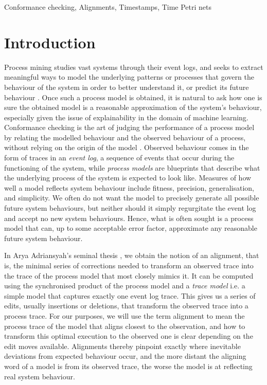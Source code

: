 \documentclass[conference]{IEEEtran}
\begin{document}
	
	\begin{IEEEkeywords}
		Conformance checking, Alignments, Timestamps, Time Petri nets
	\end{IEEEkeywords}
	
	\section{Introduction} 
    Process mining studies vast systems through their event logs, and seeks to extract meaningful ways to model the underlying patterns or processes that govern the behaviour of the system in order to better understand it, or predict its future behaviour \cite{A16}.
    Once such a process model is obtained, it is natural to ask how one is sure the obtained model is a reasonable approximation of the system’s behaviour, especially given the issue of explainability in the domain of machine learning.
    Conformance checking is the art of judging the performance of a process model by relating the modelled behaviour and the observed behaviour of a process, without relying on the origin of the model \cite{CDSW18}.
    Observed behaviour comes in the form of traces in an \textit{event log}, a sequence of events that occur during the functioning of the system, while \textit{process models} are blueprints that describe what the underlying process of the system is expected to look like.
    Measures of how well a model reflects system behaviour include fitness, precision, generalisation, and simplicity.
    We often do not want the model to precisely generate all possible future system behaviours, but neither should it simply regurgitate the event log and accept no new system behaviours. 
    Hence, what is often sought is a process model that can, up to some acceptable error factor, approximate any reasonable future system behaviour. 
    
    In Arya Adriansyah's seminal thesis \cite{Adriansyah2014AligningOA}, we obtain the notion of an alignment, that is, the minimal series of corrections needed to transform an observed trace into the trace of the process model that most closely mimics it.  
    It can be computed using the synchronised product of the process model and a \emph{trace model} i.e. a simple model that captures exactly one event log trace. 
    This gives us a series of edits, usually insertions or deletions, that transform the observed trace into a process trace.  
    For our purposes, we will use the term alignment to mean the process trace of the model that aligns closest to the observation, and how to transform this optimal execution to the observed one is clear depending on the edit moves available.
    Alignments thereby pinpoint exactly where inevitable deviations from expected behaviour occur, and the more distant the aligning word of a model is from its observed trace, the worse the model is at reflecting real system behaviour. 
    
\end{document}
